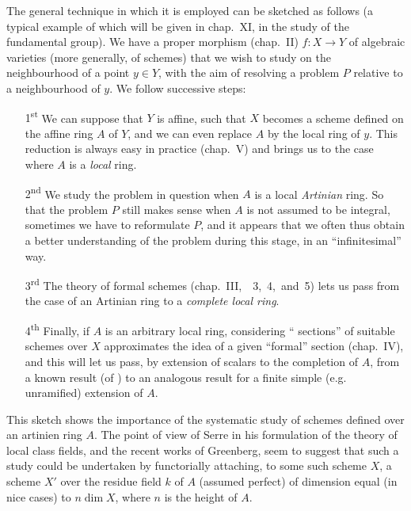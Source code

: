 \documentclass{book}
\begin{document}
The general technique in which it is employed can be sketched as follows (a
typical example of which will be given in chap.~XI, in the study of the
fundamental group). We have a proper morphism (chap.~II) $f\colon X\to Y$ of
algebraic varieties (more generally, of schemes) that we wish to study on the
neighbourhood of a point $y\in Y$, with the aim of resolving a problem $P$
relative to a neighbourhood of $y$. We follow successive steps:
\begin{itemize}
  \item[1\textsuperscript{st}]
                 We can suppose that $Y$ is affine, such that $X$ becomes a scheme
                 defined on the affine ring $A$ of $Y$, and we can even replace $A$
                 by the local ring of $y$. This reduction is always easy in practice
                 (chap.~V) and brings us to the case where $A$ is a \emph{local} ring.
  \item[2\textsuperscript{nd}]
                 We study the problem in question when $A$ is a local \emph{Artinian}
                 ring. So that the problem $P$ still makes sense when $A$ is not
                 assumed to be integral, sometimes we have to reformulate $P$, and it
                 appears that we often thus obtain a better understanding of the problem
                 during this stage, in an ``infinitesimal'' way.
  \item[3\textsuperscript{rd}]
                 The theory of formal schemes (chap.~III,~\textsection\textsection~3,~4,~and~5)
                 lets us pass from the case of an Artinian ring to a \emph{complete local ring}.
  \item[4\textsuperscript{th}]
                 Finally, if $A$ is an arbitrary local ring, considering
                 `` sections'' of suitable schemes over $X$
                 approximates the idea of a given ``formal'' section (chap.~IV), and
                 this will let us pass, by extension of scalars to the
                 completion of $A$, from a known result (of \completelyunsure) to an
                 analogous result for a finite simple (e.g. unramified) extension of $A$.
\end{itemize}

This sketch shows the importance of the systematic study of schemes defined over
an artinien ring $A$. The point of view of Serre in his formulation of the
theory of local class fields, and the recent works of Greenberg, seem
to suggest that such a study could be undertaken by functorially attaching, to
some such scheme $X$, a scheme $X'$ over the residue field $k$ of $A$ (assumed
perfect) of dimension equal (in nice cases) to $n\dim X$, where $n$ is
the height of $A$.
\end{document}
